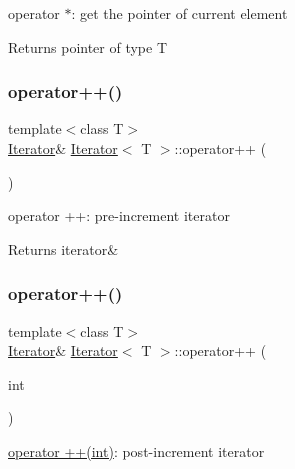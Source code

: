 operator $\ast$\+: get the pointer of current element 

\begin{DoxyReturn}{Returns}
pointer of type T 
\end{DoxyReturn}
\mbox{\label{class_iterator_a7f820677fc6ee38192e0457090646cd6}} 
\subsubsection{\texorpdfstring{operator++()}{operator++()}\hspace{0.1cm}{\footnotesize\ttfamily [1/2]}}
{\footnotesize\ttfamily template$<$class T$>$ \\
\hyperlink{class_iterator}{Iterator}\& \hyperlink{class_iterator}{Iterator}$<$ T $>$\+::operator++ (\begin{DoxyParamCaption}{ }\end{DoxyParamCaption})\hspace{0.3cm}{\ttfamily [inline]}}



operator ++\+: pre-\/increment iterator 

\begin{DoxyReturn}{Returns}
iterator\& 
\end{DoxyReturn}
\mbox{\label{class_iterator_a292066a3edaea39abf09e6a14328c489}} 
\subsubsection{\texorpdfstring{operator++()}{operator++()}\hspace{0.1cm}{\footnotesize\ttfamily [2/2]}}
{\footnotesize\ttfamily template$<$class T$>$ \\
\hyperlink{class_iterator}{Iterator}\& \hyperlink{class_iterator}{Iterator}$<$ T $>$\+::operator++ (\begin{DoxyParamCaption}\item[{int}]{ }\end{DoxyParamCaption})\hspace{0.3cm}{\ttfamily [inline]}}



\hyperlink{class_iterator_a292066a3edaea39abf09e6a14328c489}{operator ++(int)}\+: post-\/increment iterator 

